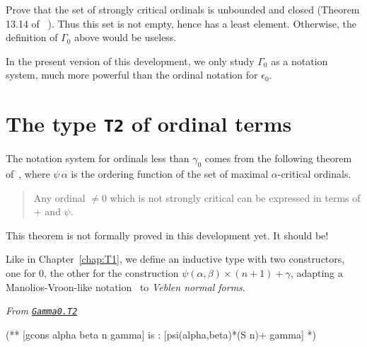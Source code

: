 {
\begin{project}
Prove that the set of strongly critical ordinals is unbounded and closed (Theorem 13.14 of~\cite{schutte} ). Thus this set is not empty,  hence has a least element. Otherwise, the definition of $\Gamma_0$ above would be useless.
\end{project}




In the present version of this development, we  only study $\Gamma_0$ as a notation system, much more powerful than the ordinal notation for $\epsilon_0$.

%




\section{The type \texttt{T2} of ordinal terms}

The notation system for ordinals less than $\gamma_0$ comes from the following theorem of~\cite{schutte}, where $\psi\,\alpha$ is the ordering function 
of the set of maximal $\alpha$-critical ordinals.


\begin{quote}
  Any ordinal $\not= 0$ which is not strongly critical can be expressed in terms of $+$ and $\psi$.
\end{quote}

\begin{project}
This theorem is not formally proved in this development yet. It should be!
\end{project}


Like in Chapter~\ref{chap:T1}, we define an inductive type with two constructors, one for $0$, the other for the construction $\psi(\alpha,\beta)\times(n+1)+\gamma$, adapting a Manolios-Vroon-like notation~\cite{Manolios2005} to
\emph{Veblen normal forms}.
\label{types:T2}

\noindent\emph{From \href{../theories/html/hydras.Gamma0.T2.html\#T2}%
{\texttt{Gamma0.T2}}}
\begin{Coqsrc}
(**  [gcons alpha beta n gamma] is : [psi(alpha,beta)*(S n)+ gamma]  *)


\end{Coqsrc}}

